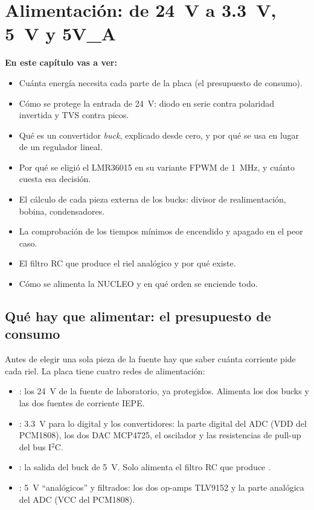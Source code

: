 \chapter[Alimentación]{Alimentación: de \SI{24}{\volt} a \SI{3.3}{\volt}, \SI{5}{\volt} y 5V\_A}\label{cap:alim}

\textbf{En este capítulo vas a ver:}
\begin{itemize}
  \item Cuánta energía necesita cada parte de la placa (el presupuesto de consumo).
  \item Cómo se protege la entrada de \SI{24}{\volt}: diodo en serie contra polaridad invertida y TVS contra picos.
  \item Qué es un convertidor \emph{buck}, explicado desde cero, y por qué se usa en lugar de un regulador lineal.
  \item Por qué se eligió el LMR36015 en su variante FPWM de \SI{1}{\mega\hertz}, y cuánto cuesta esa decisión.
  \item El cálculo de cada pieza externa de los bucks: divisor de realimentación, bobina, condensadores.
  \item La comprobación de los tiempos mínimos de encendido y apagado en el peor caso.
  \item El filtro RC que produce el riel analógico  y por qué existe.
  \item Cómo se alimenta la NUCLEO y en qué orden se enciende todo.
\end{itemize}

\section{Qué hay que alimentar: el presupuesto de consumo}\label{sec:c02-presupuesto}

Antes de elegir una sola pieza de la fuente hay que saber cuánta corriente pide cada riel. La placa tiene cuatro redes de alimentación:

\begin{itemize}
  \item {}: los \SI{24}{\volt} de la fuente de laboratorio, ya protegidos. Alimenta los dos bucks y las dos fuentes de corriente IEPE.
  \item {}: \SI{3.3}{\volt} para lo digital y los convertidores: la parte digital del ADC (VDD del PCM1808), los dos DAC MCP4725, el oscilador y las resistencias de pull-up del bus I$^2$C.
  \item {}: la salida del buck de \SI{5}{\volt}. Solo alimenta el filtro RC que produce .
  \item {}: \SI{5}{\volt} ``analógicos'' y filtrados: los dos op-amps TLV9152 y la parte analógica del ADC (VCC del PCM1808).
\end{itemize}

